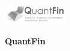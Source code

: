 \documentclass[\main/boa.tex]{subfiles}
\begin{document}
	
	\begin{minipage}[t]{0.915\textwidth}
		\center     
		\includegraphics[width=100px]{img/logos.bw/qfin.png} 
	\end{minipage}
	\begin{center}
	\Large \textbf {QuantFin}
	\end{center}
	
	\vskip 0.3cm
	\normalsize 
\vskip 1.5cm
	
\end{document}
